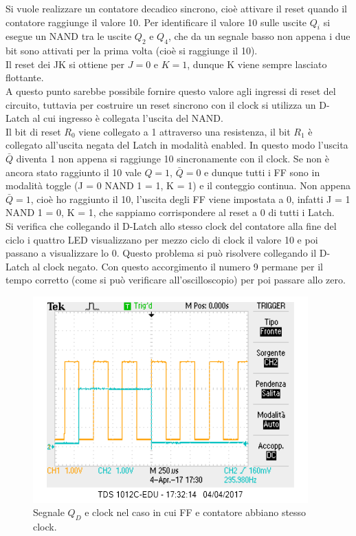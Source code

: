 \documentclass[10pt,a4paper]{article}
\begin{document}
Si vuole realizzare un contatore decadico sincrono, cioè attivare il reset quando il contatore raggiunge il valore 10. Per identificare il valore 10 sulle uscite $Q_i$ si esegue un NAND tra le uscite $Q_2$ e $Q_4$, che da un segnale basso non appena i due bit sono attivati per la prima volta (cioè si raggiunge il 10). \\
Il reset dei JK si ottiene per $J = 0$ e $K = 1$, dunque K viene sempre lasciato flottante.\\
A questo punto sarebbe possibile fornire questo valore agli ingressi di reset del circuito, tuttavia per costruire un reset sincrono con il clock si utilizza un D-Latch al cui ingresso è collegata l'uscita del NAND.\\
Il bit di reset $R_0$ viene collegato a 1 attraverso una resistenza, il bit $R_1$ è collegato all'uscita negata del Latch in modalità enabled. In questo modo l'uscita $\bar{Q}$ diventa 1 non appena si raggiunge 10 sincronamente con il clock.
Se non è ancora stato raggiunto il 10 vale $Q = 1$, $\bar{Q} = 0$ e dunque tutti i FF sono in modalità toggle (J = 0 NAND 1 = 1, K = 1) e il conteggio continua. Non appena $\bar{Q} = 1$, cioè ho raggiunto il 10, l'uscita degli FF viene impostata a 0, infatti J = 1 NAND 1 = 0, K = 1, che sappiamo corrispondere al reset a 0 di tutti i Latch.\\
Si verifica che collegando il D-Latch allo stesso clock del contatore alla fine del ciclo i quattro LED visualizzano per mezzo ciclo di clock il valore 10 e poi passano a visualizzare lo 0. Questo problema si può risolvere collegando il D-Latch al clock negato. Con questo accorgimento il numero 9 permane per il tempo corretto (come si può verificare all'oscilloscopio) per poi passare allo zero.\\


\begin{figure}[!htb]
\centering
\includegraphics[scale=1.0]{clocksbagliato.png}
\caption{Segnale $Q_D$ e clock nel caso in cui FF e contatore abbiano stesso clock.\label{sbagliato}}
\end{figure}
\end{document}
